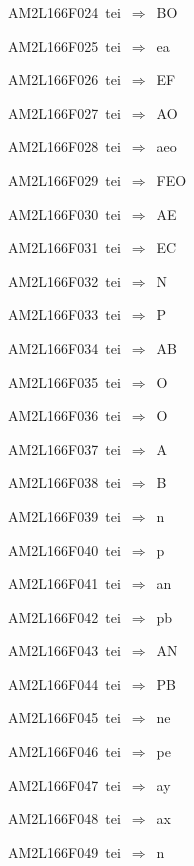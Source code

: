{\sixrm AM2L166F024\ {\sixit tei}\ }$\Rightarrow$\ BO\par\smallskip
{\sixrm AM2L166F025\ {\sixit tei}\ }$\Rightarrow$\ {\tenit ea}\par\smallskip
{\sixrm AM2L166F026\ {\sixit tei}\ }$\Rightarrow$\ EF\par\smallskip
{\sixrm AM2L166F027\ {\sixit tei}\ }$\Rightarrow$\ AO\par\smallskip
{\sixrm AM2L166F028\ {\sixit tei}\ }$\Rightarrow$\ {\tenit aeo}\par\smallskip
{\sixrm AM2L166F029\ {\sixit tei}\ }$\Rightarrow$\ FEO\par\smallskip
{\sixrm AM2L166F030\ {\sixit tei}\ }$\Rightarrow$\ AE\par\smallskip
{\sixrm AM2L166F031\ {\sixit tei}\ }$\Rightarrow$\ EC\par\smallskip
{\sixrm AM2L166F032\ {\sixit tei}\ }$\Rightarrow$\ N\par\smallskip
{\sixrm AM2L166F033\ {\sixit tei}\ }$\Rightarrow$\ P\par\smallskip
{\sixrm AM2L166F034\ {\sixit tei}\ }$\Rightarrow$\ AB\par\smallskip
{\sixrm AM2L166F035\ {\sixit tei}\ }$\Rightarrow$\ O\par\smallskip
{\sixrm AM2L166F036\ {\sixit tei}\ }$\Rightarrow$\ O\par\smallskip
{\sixrm AM2L166F037\ {\sixit tei}\ }$\Rightarrow$\ A\par\smallskip
{\sixrm AM2L166F038\ {\sixit tei}\ }$\Rightarrow$\ B\par\smallskip
{\sixrm AM2L166F039\ {\sixit tei}\ }$\Rightarrow$\ {\tenit n}\par\smallskip
{\sixrm AM2L166F040\ {\sixit tei}\ }$\Rightarrow$\ {\tenit p}\par\smallskip
{\sixrm AM2L166F041\ {\sixit tei}\ }$\Rightarrow$\ {\tenit an}\par\smallskip
{\sixrm AM2L166F042\ {\sixit tei}\ }$\Rightarrow$\ {\tenit pb}\par\smallskip
{\sixrm AM2L166F043\ {\sixit tei}\ }$\Rightarrow$\ AN\par\smallskip
{\sixrm AM2L166F044\ {\sixit tei}\ }$\Rightarrow$\ PB\par\smallskip
{\sixrm AM2L166F045\ {\sixit tei}\ }$\Rightarrow$\ {\tenit ne}\par\smallskip
{\sixrm AM2L166F046\ {\sixit tei}\ }$\Rightarrow$\ {\tenit pe}\par\smallskip
{\sixrm AM2L166F047\ {\sixit tei}\ }$\Rightarrow$\ {\tenit ay}\par\smallskip
{\sixrm AM2L166F048\ {\sixit tei}\ }$\Rightarrow$\ {\tenit ax}\par\smallskip
{\sixrm AM2L166F049\ {\sixit tei}\ }$\Rightarrow$\ {\tenit n}\par\smallskip

